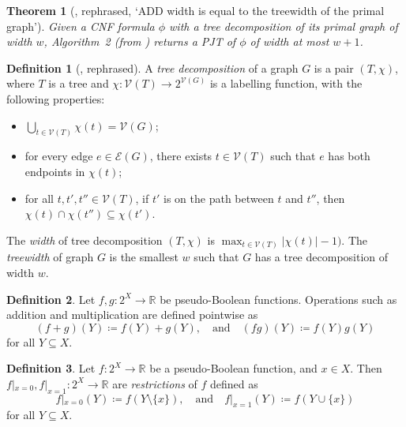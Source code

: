 \documentclass{article}
\newtheorem{theorem}{Theorem}
\theoremstyle{definition}
\newtheorem{definition}{Definition}
\theoremstyle{remark}
\begin{document}
\begin{theorem}[\cite{DBLP:conf/cp/DudekPV20}, rephrased, `ADD width is equal
  to the treewidth of the primal graph']
  Given a CNF formula $\phi$ with a tree decomposition of its primal graph of
  width $w$, Algorithm~2 (from \cite{DBLP:conf/cp/DudekPV20}) returns a
  PJT of $\phi$ of width at most $w+1$.
\end{theorem}

\begin{definition}[\cite{DBLP:journals/jct/RobertsonS84}, rephrased]
  A \emph{tree decomposition} of a graph $G$ is a pair $(T, \chi)$, where $T$ is
  a tree and $\chi\colon \mathcal{V}(T) \to 2^{\mathcal{V}(G)}$ is a labelling
  function, with the following properties:
  \begin{itemize}
  \item $\bigcup_{t \in \mathcal{V}(T)} \chi(t) = \mathcal{V}(G)$;
  \item for every edge $e \in \mathcal{E}(G)$, there exists $t \in
    \mathcal{V}(T)$ such that $e$ has both endpoints in $\chi(t)$;
  \item for all $t, t', t'' \in \mathcal{V}(T)$, if $t'$ is on the path between
    $t$ and $t''$, then $\chi(t) \cap \chi(t'') \subseteq \chi(t')$.
  \end{itemize}
  The \emph{width} of tree decomposition $(T, \chi)$ is $\max_{t \in
    \mathcal{V}(T)} |\chi(t)| - 1)$. The \emph{treewidth} of graph $G$ is the
  smallest $w$ such that $G$ has a tree decomposition of width $w$.
\end{definition}

\begin{definition} \label{def:operations}
  Let $f, g\colon 2^X \to \mathbb{R}$ be pseudo-Boolean functions. Operations
  such as addition and multiplication are defined pointwise as
  \[
    (f+g)(Y) \coloneqq f(Y)+g(Y), \quad \text{and} \quad (fg)(Y) \coloneqq
    f(Y)g(Y)
  \]
  for all $Y \subseteq X$.
\end{definition}

\begin{definition} \label{def:restriction}
  Let $f\colon 2^X \to \mathbb{R}$ be a pseudo-Boolean function, and $x \in X$.
  Then $f|_{x=0}, f|_{x=1}\colon 2^X \to \mathbb{R}$ are \emph{restrictions} of
  $f$ defined as
  \[
    f|_{x=0}(Y) \coloneqq f(Y \setminus \{x\}), \quad \text{and} \quad
    f|_{x=1}(Y) \coloneqq f(Y \cup \{x\})
  \]
  for all $Y \subseteq X$.
\end{definition}
\end{document}
